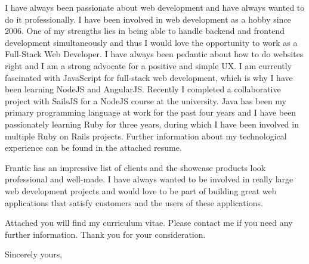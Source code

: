 \documentclass{letter} %
\begin{document}
\begin{letter}{%
}
I have always been passionate about web development and have always wanted to do it professionally. I have been involved in web development as a hobby since 2006. One of my strengths lies in being able to handle backend and frontend development simultaneously and thus I would love the opportunity to work as a Full-Stack Web Developer. I have always been pedantic about how to do websites right and I am a strong advocate for a positive and simple UX. I am currently fascinated with JavaScript for full-stack web development, which is why I have been learning NodeJS and AngularJS. Recently I completed a collaborative project with SailsJS for a NodeJS course at the university.
Java has been my primary programming language at work for the past four years and I have been passionately learning Ruby for three years, during which I have been involved in multiple Ruby on Rails projects. Further information about my technological experience can be found in the attached resume.

\noindent

Frantic has an impressive list of clients and the showcase products look professional and well-made. I have always wanted to be involved in really large web development projects and would love to be part of building great web applications that satisfy customers and the users of these applications.

Attached you will find my curriculum vitae.
Please contact me if you need any further information.
Thank you for your consideration.


\closing{Sincerely yours,}



\encl{}  				%

\end{letter}
\end{document}
